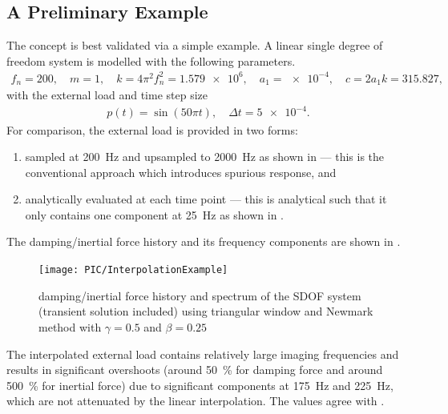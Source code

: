 \subsection{A Preliminary Example}\label{sec:sdof_example}
The concept is best validated via a simple example. A linear single degree of freedom system is modelled with the following parameters.
\begin{gather}
f_n=200,\quad{}m=1,\quad{}k=4\pi^2f_n^2=\num{1.579e6},\quad{}a_1=\num{e-4},\quad{}c=2a_1k=\num{315.827},
\end{gather}
with the external load and time step size
\begin{gather}
p\left(t\right)=\sin\left(50\pi{}t\right),\quad\Delta{}t=\num{5e-4}.
\end{gather}
For comparison, the external load is provided in two forms:
\begin{enumerate}
\item sampled at \SI{200}{\hertz} and upsampled to \SI{2000}{\hertz} as shown in  --- this is the conventional approach which introduces spurious response, and
\item analytically evaluated at each time point --- this is analytical such that it only contains one component at \SI{25}{\hertz} as shown in .
\end{enumerate}
The damping/inertial force history and its frequency components are shown in .
\begin{figure}[htb!]
\centering
\texttt{[image: PIC/InterpolationExample]}
\caption{damping/inertial force history and spectrum of the SDOF system (transient solution included) using triangular window and Newmark method with $\gamma=0.5$ and $\beta=0.25$}\label{fig:sdof_force}
\end{figure}
The interpolated external load contains relatively large imaging frequencies and results in significant overshoots (around \SI{50}{\percent} for damping force and around \SI{500}{\percent} for inertial force) due to significant components at \SI{175}{\hertz} and \SI{225}{\hertz}, which are not attenuated by the linear interpolation. The values agree with .


